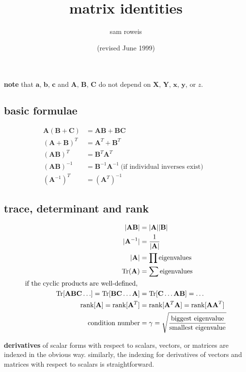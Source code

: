 \documentclass[11pt]{article}
\title{matrix identities}
\author{sam roweis}
\date{(revised June 1999)}
\renewcommand{\vec}[1]{\mathbf{#1}}
\newcommand{\mat}[1]{\mathbf{#1}}
\renewcommand{\t}{T}
\newcommand{\inv}{{-1}}
\numberwithin{equation}{subsection}
\begin{document}
\maketitle

\textbf{note} that $\vec{a}$, $\vec{b}$, $\vec{c}$ and $\mat{A}$, 
$\mat{B}$, $\mat{C}$ do not depend on $\mat{X}$, $\mat{Y}$, 
$\vec{x}$, $\vec{y}$, or $z$.

\subsection{basic formulae}
\begin{align}
\mat{A}(\mat{B} + \mat{C}) & = \mat{AB} + \mat{BC} & \\
(\mat{A} + \mat{B})^\t & = \mat{A}^\t + \mat{B}^\t &\\
(\mat{AB})^\t & = \mat{B}^\t\mat{A}^\t & \\
(\mat{AB})^{-1} & = 
	\mat{B}^\inv \mat{A}^\inv \ \text{(if individual inverses exist)} \\
(\mat{A}^\inv)^\t & = (\mat{A}^\t)^\inv
\end{align}
\subsection{trace, determinant and rank}
\begin{align}
|\mat{AB}| & = |\mat{A}||\mat{B}|  \\
|\mat{A}^\inv| & = \frac{1}{|\mat{A}|}  \\
|\mat{A}| & = \prod \text{eigenvalues}  \\
\mathrm{Tr}(\mat{A}) & = \sum \text{eigenvalues}  \\
\text{if the cyclic products are well-defined, } & \notag \\
\mathrm{Tr}[\mat{A}\mat{B}\mat{C} \ldots] = \mathrm{Tr}[\mat{B}\mat{C} 
\ldots \mat{A}] & = \mathrm{Tr}[\mat{C} \ldots \mat{A}\mat{B}] = \ldots   \\
\mathrm{rank}[\mat{A}] = \mathrm{rank}[\mat{A}^\t ] 
& = \mathrm{rank}[\mat{A}^\t \mat{A}] = \mathrm{rank}[\mat{AA}^\t]  \\
\text{condition number} & = \gamma = 
	\sqrt{\frac{\text{biggest eigenvalue}}{\text{smallest eigenvalue}}} 
\end{align}

\textbf{derivatives} of scalar forms with respect to scalars,
vectors, or matrices are indexed in the obvious way.
similarly, the indexing for derivatives of vectors and matrices
with respect to scalars is straightforward.
\end{document}
